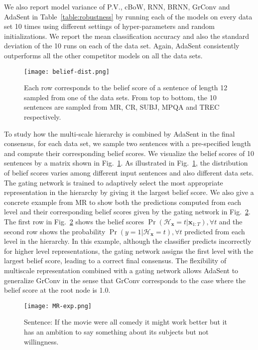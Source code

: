 \documentclass{article}
\theoremstyle{definition}
\begin{document}
We also report model variance of P.V., cBoW, RNN, BRNN, GrConv and AdaSent in Table~\ref{table:robustness} by running each of the models on every data set 10 times using different settings of hyper-parameters and random initializations. We report the mean classification accuracy and also the standard deviation of the 10 runs on each of the data set. Again, AdaSent consistently outperforms all the other competitor models on all the data sets.
\begin{figure}[htb]
\centering
	\texttt{[image: belief-dist.png]}
\caption{Each row corresponds to the belief score of a sentence of length 12 sampled from one of the data sets.  From top to bottom, the 10 sentences are sampled from MR, CR, SUBJ, MPQA and TREC respectively.}
\label{fig:belief}
\end{figure}

To study how the multi-scale hierarchy is combined by AdaSent in the final consensus, for each data set, we sample two sentences with a pre-specified length and compute their corresponding belief scores. We visualize the belief scores of 10 sentences by a matrix shown in Fig.~\ref{fig:belief}. As illustrated in Fig.~\ref{fig:belief}, the distribution of belief scores varies among different input sentences and also different data sets. The gating network is trained to adaptively select the most appropriate representation in the hierarchy by giving it the largest belief score. We also give a concrete example from MR to show both the predictions computed from each level and their corresponding belief scores given by the gating network in Fig.~\ref{fig:MR-exp}. The first row in Fig.~\ref{fig:MR-exp} shows the belief scores $\Pr(\mathcal{H}_{\mathbf{x}} = t|\mathbf{x}_{1:T}),\forall t$ and the second row shows the probability $\Pr(y=1|\mathcal{H}_{\mathbf{x}}=t),\forall t$ predicted from each level in the hierarchy. In this example, although the classifier predicts incorrectly for higher level representations, the gating network assigns the first level with the largest belief score, leading to a correct final consensus. The flexibility of multiscale representation combined with a gating network allows AdaSent to generalize GrConv in the sense that GrConv corresponds to the case where the belief score at the root node is 1.0.
\begin{figure}[htb]
\centering
	\texttt{[image: MR-exp.png]}
\caption{Sentence: If the movie were all comedy it might work better but it has an ambition to say something about its subjects but not willingness.}
\label{fig:MR-exp}
\end{figure}
\end{document}
